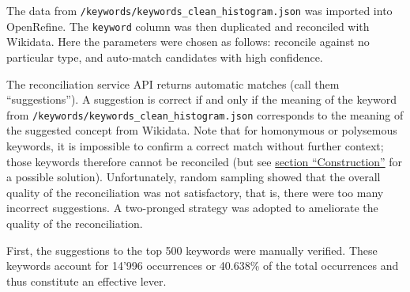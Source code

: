 The data from \texttt{/keywords/keywords\_clean\_histogram.json} was
imported into OpenRefine. The \texttt{keyword} column was then
duplicated and reconciled with Wikidata. Here the parameters were chosen
as follows: reconcile against no particular type, and auto-match
candidates with high confidence.

The reconciliation service API returns automatic matches (call them
``suggestions''). A suggestion is correct if and only if the meaning of
the keyword from \texttt{/keywords/keywords\_clean\_histogram.json}
corresponds to the meaning of the suggested concept from Wikidata. Note
that for homonymous or polysemous keywords, it is impossible to confirm
a correct match without further context; those keywords therefore cannot
be reconciled (but see \protect\hyperlink{construction}{section
``Construction''} for a possible solution). Unfortunately, random
sampling showed that the overall quality of the reconciliation was not
satisfactory, that is, there were too many incorrect suggestions. A
two-pronged strategy was adopted to ameliorate the quality of the
reconciliation.

First, the suggestions to the top 500 keywords were manually verified.
These keywords account for 14'996 occurrences or 40.638\% of the total
occurrences and thus constitute an effective lever.

